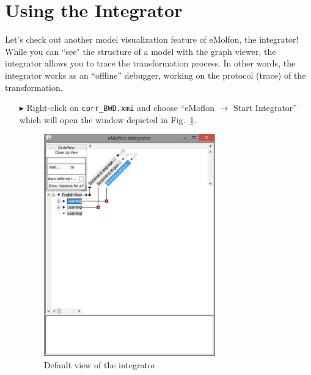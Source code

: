 \newpage
\section{Using the Integrator}
\genHeader
\label{sec:app_integrator}


Let's check out another model visualization feature of eMolfon, the integrator! While you can ``see" the structure of a model with the graph viewer, the
integrator allows you to trace the transformation process. In other words, the integrator works as an ``offline'' debugger, working on the protocol (trace) of
the transformation.

\begin{itemize}

\item[$\blacktriangleright$] Right-click on \texttt{corr\_BWD.xmi} and choose ``eMoflon $\rightarrow$ Start Integrator'' which will open the window depicted in
Fig.~\ref{fig:integrator_start}.

\begin{figure}[htbp]
\begin{center}
  \includegraphics[width=0.7\textwidth]{integrator_start_view.pdf}
  \caption{Default view of the integrator}
  \label{fig:integrator_start}
\end{center}
\end{figure}


\end{itemize}
